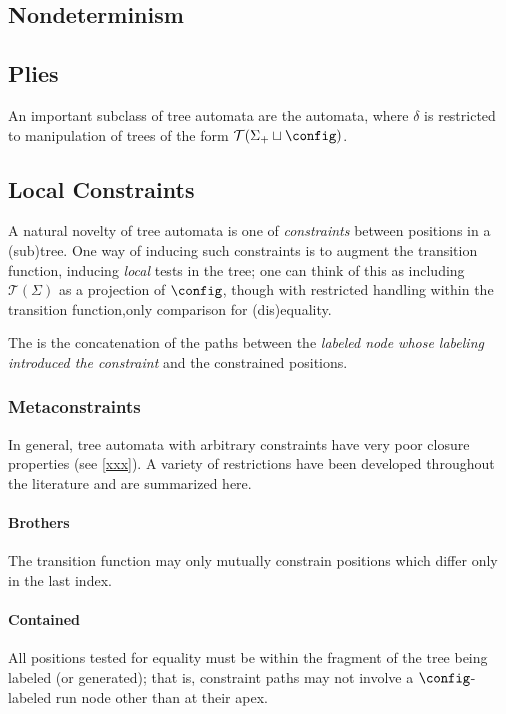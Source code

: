 \subsection{Nondeterminism}

\subsection{Plies}

An important subclass of tree automata are the  automata,
where $\delta$ is restricted to manipulation of trees of the form
$\mathcal{T}(\Sigma_+ \sqcup \config)$.

\subsection{Local Constraints}

A natural novelty of tree automata is one of {\em constraints} between
positions in a (sub)tree.  One way of inducing such constraints is to
augment the transition function, inducing {\em local} tests in the tree; one
can think of this as including $\mathcal{T}(\Sigma)$ as a projection of
$\config$, though with restricted handling within the transition
function,\eg only comparison for (dis)equality.

The  is the concatenation of the paths between the
{\em labeled node whose labeling introduced the constraint} and the
constrained positions.

\subsubsection{Metaconstraints}

In general, tree automata with arbitrary constraints have very poor closure
properties (see \autoref{xxx}).  A variety of restrictions have been
developed throughout the literature and are summarized here.

\paragraph{Brothers} The transition function may only mutually constrain
positions which differ only in the last index.

\paragraph{Contained} All positions tested for equality must be within the
fragment of the tree being labeled (or generated); that is, constraint paths
may not involve a $\config$-labeled run node other than at their apex.

